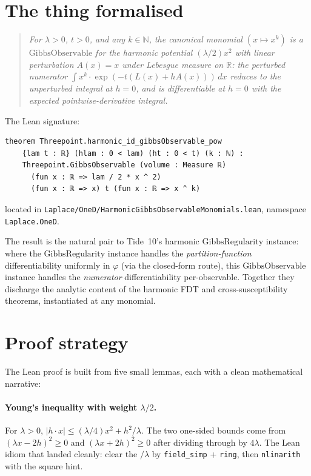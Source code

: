 \documentclass[11pt]{article}
\newcommand{\GR}{\mathrm{GibbsRegularity}}
\newcommand{\GO}{\mathrm{GibbsObservable}}
\begin{document}
\section{The thing formalised}

\begin{quote}\itshape
For \(\lambda > 0\), \(t > 0\), and any \(k \in \mathbb{N}\), the
canonical monomial \((x \mapsto x^k)\) is a \(\GO\) for the harmonic
potential \((\lambda/2) x^2\) with linear perturbation \(A(x) = x\)
under Lebesgue measure on \(\mathbb{R}\): the perturbed numerator
\(\int x^k \cdot \exp(-t(L(x) + h A(x)))\,dx\) reduces to the
unperturbed integral at \(h = 0\), and is differentiable at \(h = 0\)
with the expected pointwise-derivative integral.
\end{quote}

\noindent The Lean signature:
\begin{verbatim}
theorem Threepoint.harmonic_id_gibbsObservable_pow
    {lam t : ℝ} (hlam : 0 < lam) (ht : 0 < t) (k : ℕ) :
    Threepoint.GibbsObservable (volume : Measure ℝ)
      (fun x : ℝ => lam / 2 * x ^ 2)
      (fun x : ℝ => x) t (fun x : ℝ => x ^ k)
\end{verbatim}

\noindent located in
\texttt{Laplace/OneD/HarmonicGibbsObservableMonomials.lean}, namespace
\texttt{Laplace.OneD}.

The result is the natural pair to Tide~10's harmonic
\(\GR\) instance: where the \(\GR\) instance handles the
\emph{partition-function} differentiability uniformly in \(\varphi\)
(via the closed-form route), this \(\GO\) instance handles the
\emph{numerator} differentiability per-observable. Together they
discharge the analytic content of the harmonic FDT and
cross-susceptibility theorems, instantiated at any monomial.

\section{Proof strategy}

The Lean proof is built from five small lemmas, each with a clean
mathematical narrative:

\paragraph{Young's inequality with weight \(\lambda/2\).} For
\(\lambda > 0\), \(|h \cdot x| \le (\lambda/4) x^2 + h^2/\lambda\). The
two one-sided bounds come from \((\lambda x - 2h)^2 \ge 0\) and
\((\lambda x + 2h)^2 \ge 0\) after dividing through by \(4 \lambda\).
The Lean idiom that landed cleanly: clear the \(/\lambda\) by
\texttt{field\_simp} + \texttt{ring}, then \texttt{nlinarith} with the
square hint.
\end{document}
